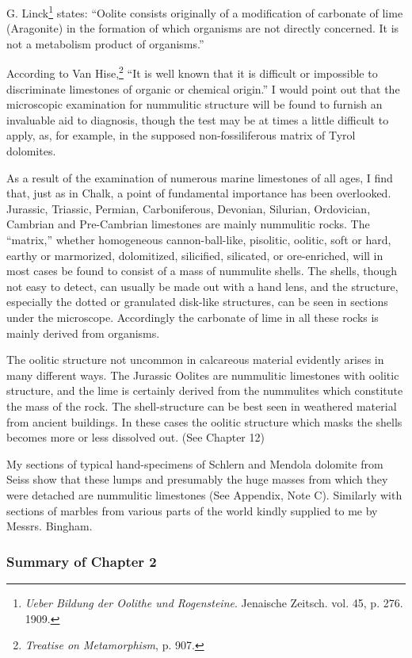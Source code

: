 \documentclass[a4paper, 12pt, oneside]{article}
\begin{document}
G. Linck\footnote{\emph{Ueber Bildung der Oolithe und Rogensteine}. Jenaische Zeitsch. vol. 45, p. 276. 1909.} states: ``Oolite consists originally of a modification of carbonate of lime (Aragonite) in the formation of which organisms are not directly concerned. It is not a metabolism product of organisms.''

According to Van Hise,\footnote{\emph{Treatise on Metamorphism}, p. 907.} ``It is well known that it is difficult or impossible to discriminate limestones of organic or chemical origin.'' I would point out that the microscopic examination for nummulitic structure will be found to furnish an invaluable aid to diagnosis, though the test may be at times a little difficult to apply, as, for example, in the supposed non-fossiliferous matrix of Tyrol dolomites.

As a result of the examination of numerous marine limestones of all ages, I find that, just as in Chalk, a point of fundamental importance has been overlooked. Jurassic, Triassic, Permian, Carboniferous, Devonian, Silurian, Ordovician, Cambrian and Pre-Cambrian limestones are mainly nummulitic rocks. The ``matrix,'' whether homogeneous cannon-ball-like, pisolitic, oolitic, soft or hard, earthy or marmorized, dolomitized, silicified, silicated, or ore-enriched, will in most cases be found to consist of a mass of nummulite shells. The shells, though not easy to detect, can usually be made out with a hand lens, and the structure, especially the dotted or granulated disk-like structures, can be seen in sections under the microscope. Accordingly the carbonate of lime in all these rocks is mainly derived from organisms.

The oolitic structure not uncommon in calcareous material evidently arises in many different ways. The Jurassic Oolites are nummulitic limestones with oolitic structure, and the lime is certainly derived from the nummulites which constitute the mass of the rock. The shell-structure can be best seen in weathered material from ancient buildings. In these cases the oolitic structure which masks the shells becomes more or less dissolved out. (See Chapter 12)

My sections of typical hand-specimens of Schlern and Mendola dolomite from Seiss show that these lumps and presumably the huge masses from which they were detached are nummulitic limestones (See Appendix, Note C). Similarly with sections of marbles from various parts of the world kindly supplied to me by Messrs. Bingham.

\subsubsection{Summary of Chapter 2}
\end{document}
